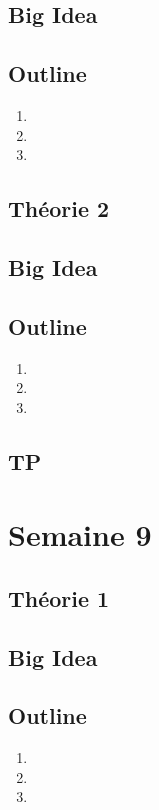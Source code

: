\documentclass{article}
\begin{document}
\subsection*{Big Idea}
\subsection*{Outline}
    \begin{enumerate}
    \item
    \item
    \item
    \end{enumerate}
\subsection{Théorie 2}
\subsection*{Big Idea}
\subsection*{Outline}
    \begin{enumerate}
    \item
    \item
    \item
    \end{enumerate}
\subsection{TP}

\pagebreak
\section{Semaine 9}
\subsection{Théorie 1}
\subsection*{Big Idea}
\subsection*{Outline}
    \begin{enumerate}
    \item
    \item
    \item
    \end{enumerate}
\end{document}
